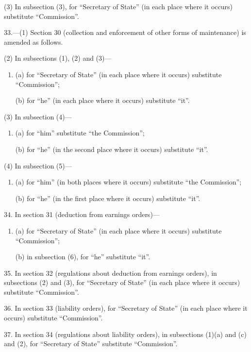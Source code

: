 \documentclass[a4paper]{article}
\begin{document}
(3) In subsection (3), for “Secretary of State” (in each place where it occurs) substitute “Commission”.

\medskip

33.---(1) Section 30 (collection and enforcement of other forms of maintenance) is amended as follows.

(2) In subsections (1), (2) and (3)—
\begin{enumerate}\item[]
(a) for “Secretary of State” (in each place where it occurs) substitute “Commission”;

(b) for “he” (in each place where it occurs) substitute “it”.
\end{enumerate}

(3) In subsection (4)—
\begin{enumerate}\item[]
(a) for “him” substitute “the Commission”;

(b) for “he” (in the second place where it occurs) substitute “it”.
\end{enumerate}

(4) In subsection (5)—
\begin{enumerate}\item[]
(a) for “him” (in both places where it occurs) substitute “the Commission”;

(b) for “he” (in the first place where it occurs) substitute “it”.
\end{enumerate}

\medskip

34. In section 31 (deduction from earnings orders)—
\begin{enumerate}\item[]
(a) for “Secretary of State” (in each place where it occurs) substitute “Commission”;

(b) in subsection (6), for “he” substitute “it”.
\end{enumerate}

\medskip

35. In section 32 (regulations about deduction from earnings orders), in subsections (2) and (3), for “Secretary of State” (in each place where it occurs) substitute “Commission”.

\medskip

36. In section 33 (liability orders), for “Secretary of State” (in each place where it occurs) substitute “Commission”.

\medskip

37. In section 34 (regulations about liability orders), in subsections (1)(a) and (c) and (2), for “Secretary of State” substitute “Commission”.
\end{document}
